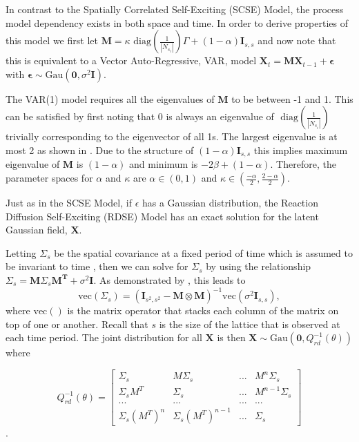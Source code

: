 \documentclass[11pt]{isuthesis}
\begin{document}
In contrast to the Spatially Correlated Self-Exciting (SCSE) Model, the process model dependency exists in both space and time.  In order to derive properties of this model we first let $\boldsymbol{M}=\kappa \text{ diag}\left( \frac{1}{|N_{s_i}|}\right) \Gamma + (1-\alpha) \boldsymbol{I}_{s,s}$ and now note that this is equivalent to a Vector Auto-Regressive, VAR, model $\boldsymbol{X}_t = \boldsymbol{M} \boldsymbol{X}_{t-1} +  \boldsymbol{\epsilon}$ with $\boldsymbol{\epsilon}\sim \mbox{Gau}(\boldsymbol{0},\sigma^2 \boldsymbol{I})$.

The VAR(1) model requires all the eigenvalues of $\boldsymbol{M}$ to be between -1 and 1.  This can be satisfied by first noting that 0 is always an eigenvalue of $\text{ diag}\left( \frac{1}{|N_{s_i}|}\right)$ trivially corresponding to the eigenvector of all 1s.  The largest eigenvalue is at most 2 as shown in \cite{chung1997spectral}.  Due to the structure of $(1-\alpha) \boldsymbol{I}_{s,s}$ this implies maximum eigenvalue of $\boldsymbol{M}$ is $(1-\alpha)$ and minimum is  $-2\beta+(1-\alpha)$.  Therefore, the parameter spaces for $\alpha$ and $\kappa$ are $\alpha \in (0,1)$ and $\kappa \in (\frac{-\alpha}{2},\frac{2-\alpha}{2})$.


Just as in the SCSE Model, if $\epsilon$ has a Gaussian distribution, the Reaction Diffusion Self-Exciting (RDSE) Model has an exact solution for the latent Gaussian field, $\boldsymbol{X}$.  

Letting $\Sigma_s$ be the spatial covariance at a fixed period of time which is assumed to be invariant to time , then we can solve for $\Sigma_s$ by using the relationship $\Sigma_s = \boldsymbol{M}\Sigma_s\boldsymbol{M^T} + \sigma^2 \boldsymbol{I}$.  As demonstrated by \cite{cressie2015statistics}, this leads to  \begin{equation}\text{vec}(\Sigma_s)=\left(\boldsymbol{I}_{s^2,s^2}-\boldsymbol{M}\otimes\boldsymbol{M}\right)^{-1}\text{vec}\left(\sigma^2 \boldsymbol{I}_{s,s}\right),\end{equation} where $\text{vec}\left( \right)$ is the matrix operator that stacks each column of the matrix on top of one or another.  Recall that $s$ is the size of the lattice that is observed at each time period.  The joint distribution for all $\boldsymbol{X}$ is then $\boldsymbol{X}\sim \mbox{Gau}(\boldsymbol{0},Q_{rd}^{-1}(\theta))$ where


\begin{equation}
Q_{rd}^{-1}(\theta)=
\left[
\begin{array}{c|c|c|c}
\Sigma_s & M \Sigma_s & ... & M^n\Sigma_s \\
\hline
\Sigma_s M^T & \Sigma_s & ... & M^{n-1}\Sigma_s\\
\hline
... & ... & ... & ...\\
\hline
\Sigma_s (M^T)^n & \Sigma_s (M^T)^{n-1}& ... & \Sigma_s
\end{array} 
\right]\label{eq:Sig}
\end{equation}
.
\end{document}
